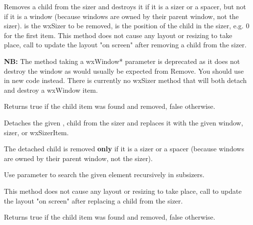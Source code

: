 


Removes a child from the sizer and destroys it if it is a sizer or a spacer,
but not if it is a window (because windows are owned by their parent window,
not the sizer).   is the wxSizer to be removed,
 is the position of the child in the sizer, e.g. $0$ for the first item.
This method does not cause any layout or resizing to take place, call
 to update the layout "on screen" after removing a
child from the sizer.

{\bf NB:} The method taking a wxWindow* parameter is deprecated as it does not
destroy the window as would usually be expected from Remove.  You should use 
 in new code instead.  There is
currently no wxSizer method that will both detach and destroy a wxWindow item.

Returns true if the child item was found and removed, false otherwise.


\label{wxsizerreplace}




Detaches the given ,  child from the sizer and 
replaces it with the given window, sizer, or wxSizerItem.

The detached child is removed {\bf only} if it is a sizer or a spacer
(because windows are owned by their parent window, not the sizer).

Use parameter  to search the given element recursively in subsizers.


This method does not cause any layout or resizing to take place, call
 to update the layout "on screen" after replacing a
child from the sizer.

Returns true if the child item was found and removed, false otherwise.


\label{wxsizersetdimension}

